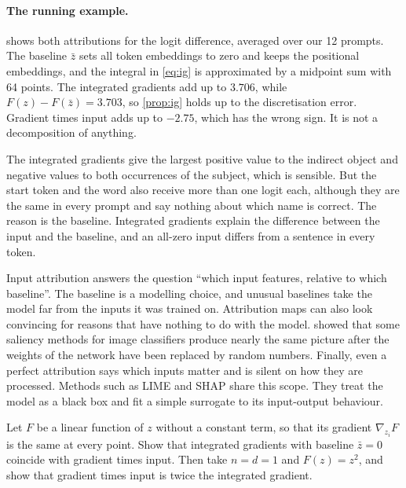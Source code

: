 \paragraph{The running example.}  shows both attributions for the logit difference, averaged over
our 12 prompts. The baseline $\bar z$ sets all token embeddings to zero and keeps the positional embeddings, and
the integral in \eqref{eq:ig} is approximated by a midpoint sum with 64 points. The integrated gradients add up to
$3.706$, while $F(z)-F(\bar z)=3.703$, so \cref{prop:ig} holds up to the discretisation error. Gradient times
input adds up to $-2.75$, which has the wrong sign. It is not a decomposition of anything.


The integrated gradients give the largest positive value to the indirect object and negative values to both
occurrences of the subject, which is sensible. But the start token and the word  also receive more
than one logit each, although they are the same in every prompt and say nothing about which name is correct.
The reason is the baseline. Integrated gradients explain the difference between the input and the baseline,
and an all-zero input differs from a sentence in every token.

\begin{caution}
Input attribution answers the question ``which input features, relative to which baseline''. The baseline is a
modelling choice, and unusual baselines take the model far from the inputs it was trained on. Attribution maps
can also look convincing for reasons that have nothing to do with the model. \citet{adebayo2018sanity} showed
that some saliency methods for image classifiers produce nearly the same picture after the weights of the
network have been replaced by random numbers. Finally, even a perfect attribution says which inputs matter and
is silent on how they are processed. Methods such as LIME \citep{ribeiro2016should} and SHAP
\citep{lundberg2017unified} share this scope. They treat the model as a black box and fit a simple surrogate to
its input-output behaviour.
\end{caution}

\begin{exercise}\label{ex:linearig}
Let $F$ be a linear function of $z$ without a constant term, so that its gradient $\nabla_{z_i}F$ is the same at
every point. Show that integrated gradients with baseline $\bar z=0$ coincide with gradient times input. Then
take $n=d=1$ and $F(z)=z^2$, and show that gradient times input is twice the integrated gradient.
\end{exercise}

